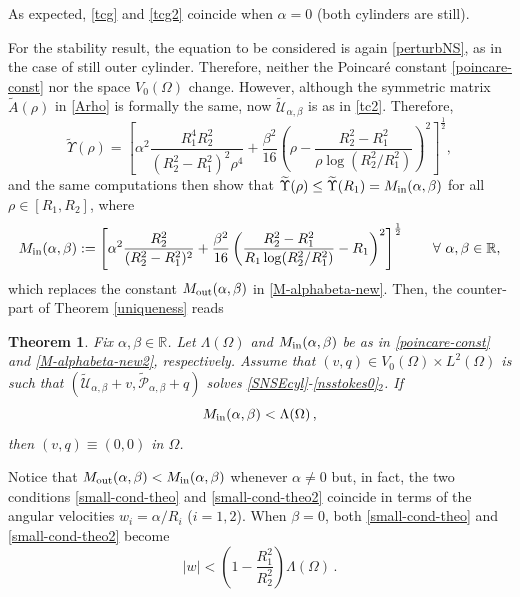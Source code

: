 \documentclass[a4paper,11pt]{amsart}
\newtheorem{theorem}{Theorem}[section]
\numberwithin{equation}{section}
\numberwithin{figure}{section}
\newcommand{\R}{\mathbb{R}}
\def\U{{\mathcal U}}
\def\P{{\mathcal P}}
\begin{document}
	As expected, \eqref{tcg} and \eqref{tcg2} coincide when $\alpha=0$ (both cylinders are still).\par
	For the stability result, the equation to be considered is again \eqref{perturbNS}, as in the case of still outer cylinder.
	Therefore, neither the Poincaré constant \eqref{poincare-const} nor the space $V_0(\Omega)$ change.
	However, although the symmetric matrix $\widetilde A(\rho)$ in \eqref{Arho} is formally the same, now $\widetilde\U_{\alpha,\beta}$ is as in \eqref{tc2}. Therefore,
	$$
	\widetilde\Upsilon(\rho)=\left[\alpha^2\frac{R_1^4R_2^2}{(R_2^2-R_1^2)^2\rho^4}
	+\frac{\beta^2}{16}\left(\rho-\frac{R_2^2-R_1^2}{\rho\log(R_2^2/R_1^2)}\right)^2\right]^{\frac{1}{2}},
	$$
	and the same computations then show that $\widetilde\Upsilon(\rho)\le\widetilde\Upsilon(R_1)=M_{\rm in}(\alpha,\beta)$ for all $\rho\in[R_1,R_2]$, where
	\begin{equation}\label{M-alphabeta-new2}
		M_{\rm in}(\alpha,\beta):= \left[\alpha^2 \frac{R_2^2}{(R_2^2 -R_1^2)^2}+ \frac{\beta^2}{16}
		\left(\frac{R_2^2-R_1^2}{R_1\log(R_2^2/R_1^2)}-R_1  \right)^2\right]^{\frac{1}{2}}\qquad\forall \ \alpha,\beta\in\R,
	\end{equation}
	which replaces the constant $M_{\rm out}(\alpha,\beta)$ in \eqref{M-alphabeta-new}. Then, the counter-part of Theorem \ref{uniqueness} reads
	
	\begin{theorem}\label{uniqueness2}
		Fix $\alpha,\beta\in\mathbb{R}$. Let $\Lambda(\Omega)$ and $M_{\rm in}(\alpha,\beta)$ be as in \eqref{poincare-const} and \eqref{M-alphabeta-new2}, respectively. Assume that $(v,q)\in V_0(\Omega)\times L^2(\Omega)$
		is such that $(\widetilde\U_{\alpha,\beta} + v , \widetilde\P_{\alpha,\beta} + q)$  solves \eqref{SNSEcyl}-\eqref{nsstokes0}$_2$. If
		\begin{equation}\label{small-cond-theo2}
			M_{\rm in}(\alpha,\beta) < \Lambda (\Omega)\,,
		\end{equation}
		then $(v,q)\equiv(0,0)$ in $\Omega$.
	\end{theorem}
	
	Notice that $M_{\rm out}(\alpha,\beta)<M_{\rm in}(\alpha,\beta)$ whenever $\alpha\neq0$ but, in fact, the two conditions
	\eqref{small-cond-theo} and \eqref{small-cond-theo2} coincide in terms of the angular velocities $w_i=\alpha/R_i$ ($i=1,2$).
	When $\beta=0$, both \eqref{small-cond-theo} and \eqref{small-cond-theo2} become
	$$
	|w|<\left(1-\frac{R_1^2}{R_2^2}\right)\Lambda(\Omega)\, .
	$$
	
\end{document}
